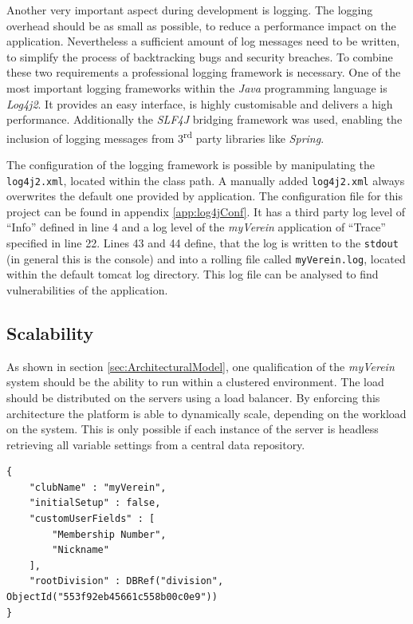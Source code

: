 Another very important aspect during development is logging. The logging overhead should be as small as possible, to reduce a performance impact on the application. Nevertheless a sufficient amount of log messages need to be written, to simplify the process of backtracking bugs and security breaches. To combine these two requirements a professional logging framework is necessary. One of the most important logging frameworks within the \emph{Java} programming language is \emph{Log4j2}. It provides an easy interface, is highly customisable and delivers a high performance. Additionally the \emph{SLF4J} bridging framework was used, enabling the inclusion of logging messages from 3\textsuperscript{rd} party libraries like \emph{Spring}.

The configuration of the logging framework is possible by manipulating the \texttt{log4j2.xml}, located within the class path. A manually added \texttt{log4j2.xml} always overwrites the default one provided by application. The configuration file for this project can be found in appendix \vref{app:log4jConf}. It has a third party log level of \enquote{Info} defined in line 4 and a log level of the \emph{myVerein} application of \enquote{Trace} specified in line 22. Lines 43 and 44 define, that the log is written to the \texttt{stdout} (in general this is the console) and into a rolling file called \texttt{myVerein.log}, located within the default tomcat log directory. This log file can be analysed to find vulnerabilities of the application.

\subsection{Scalability}
\label{sec:Scalability}

As shown in section \vref{sec:ArchitecturalModel}, one qualification of the \emph{myVerein} system should be the ability to run within a clustered environment. The load should be distributed on the servers using a load balancer. By enforcing this architecture the platform is able to dynamically scale, depending on the workload on the system. This is only possible if each instance of the server is headless retrieving all variable settings from a central data repository. 

\begin{lstlisting}[caption ={Example layout of settings document}, label=lst:SettingsDoc]
{
	"clubName" : "myVerein", 
	"initialSetup" : false, 
	"customUserFields" : [
		"Membership Number",
		"Nickname"
	],
	"rootDivision" : DBRef("division", ObjectId("553f92eb45661c558b00c0e9")) 
}
\end{lstlisting}

